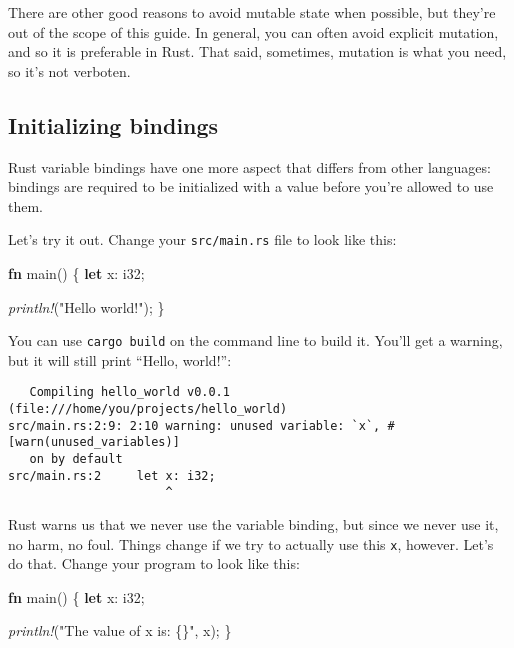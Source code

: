 \documentclass[a4paper,]{book}
\newenvironment{Shaded}{\begin{snugshade}}{\end{snugshade}}
\newcommand{\KeywordTok}[1]{\textcolor[rgb]{0.13,0.29,0.53}{\textbf{{#1}}}}
\newcommand{\DataTypeTok}[1]{\textcolor[rgb]{0.13,0.29,0.53}{{#1}}}
\newcommand{\StringTok}[1]{\textcolor[rgb]{0.31,0.60,0.02}{{#1}}}
\newcommand{\PreprocessorTok}[1]{\textcolor[rgb]{0.56,0.35,0.01}{\textit{{#1}}}}
\newcommand{\NormalTok}[1]{{#1}}
\begin{document}
There are other good reasons to avoid mutable state when possible, but
they're out of the scope of this guide. In general, you can often avoid
explicit mutation, and so it is preferable in Rust. That said,
sometimes, mutation is what you need, so it's not verboten.

\subsection{Initializing bindings}\label{initializing-bindings}

Rust variable bindings have one more aspect that differs from other
languages: bindings are required to be initialized with a value before
you're allowed to use them.

Let's try it out. Change your \texttt{src/main.rs} file to look like
this:

\begin{Shaded}
\begin{Highlighting}[]
\KeywordTok{fn} \NormalTok{main() \{}
    \KeywordTok{let} \NormalTok{x: }\DataTypeTok{i32}\NormalTok{;}

    \PreprocessorTok{println!}\NormalTok{(}\StringTok{"Hello world!"}\NormalTok{);}
\NormalTok{\}}
\end{Highlighting}
\end{Shaded}

You can use \texttt{cargo\ build} on the command line to build it.
You'll get a warning, but it will still print ``Hello, world!'':

\begin{verbatim}
   Compiling hello_world v0.0.1 (file:///home/you/projects/hello_world)
src/main.rs:2:9: 2:10 warning: unused variable: `x`, #[warn(unused_variables)]
   on by default
src/main.rs:2     let x: i32;
                      ^
\end{verbatim}

Rust warns us that we never use the variable binding, but since we never
use it, no harm, no foul. Things change if we try to actually use this
\texttt{x}, however. Let's do that. Change your program to look like
this:

\begin{Shaded}
\begin{Highlighting}[]
\KeywordTok{fn} \NormalTok{main() \{}
    \KeywordTok{let} \NormalTok{x: }\DataTypeTok{i32}\NormalTok{;}

    \PreprocessorTok{println!}\NormalTok{(}\StringTok{"The value of x is: \{\}"}\NormalTok{, x);}
\NormalTok{\}}
\end{Highlighting}
\end{Shaded}
\end{document}
